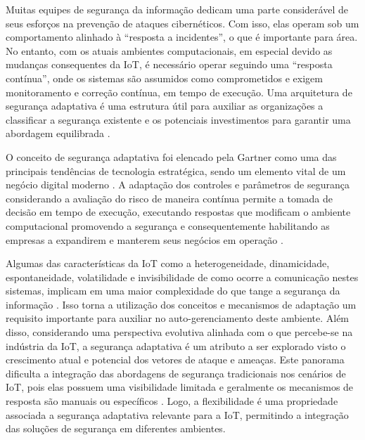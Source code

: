 \documentclass[tid,table]{texufpel} %
\begin{document}
Muitas equipes de segurança da informação dedicam uma parte considerável de seus esforços na prevenção de ataques cibernéticos. Com isso, elas operam sob um comportamento alinhado à ``resposta a incidentes'', o que é importante para área. No entanto, com os atuais ambientes computacionais, em especial devido as mudanças consequentes da IoT, é necessário operar seguindo uma ``resposta contínua'', onde os sistemas são assumidos como comprometidos e exigem monitoramento e correção contínua, em tempo de execução. Uma arquitetura de segurança adaptativa é uma estrutura útil para auxiliar as organizações a classificar a segurança existente e os potenciais investimentos para garantir uma abordagem equilibrada \cite{gartneradaptsec17}. 

O conceito de segurança adaptativa foi elencado pela Gartner como uma das principais tendências de tecnologia estratégica, sendo um elemento vital de um negócio digital moderno \cite{gartnerttrends17}. A adaptação dos controles e parâmetros de segurança considerando a avaliação do risco de maneira contínua permite a tomada de decisão em tempo de execução, executando respostas que modificam o ambiente computacional promovendo a segurança e consequentemente habilitando as empresas a expandirem e manterem seus negócios em operação \cite{gartnerttrends18}.

Algumas das características da IoT como a heterogeneidade, dinamicidade, espontaneidade, volatilidade e invisibilidade de como ocorre a comunicação nestes sistemas, implicam em uma maior complexidade do que tange a segurança da informação \cite{langheinrich10}. Isso torna a utilização dos conceitos e mecanismos de adaptação um requisito importante para auxiliar no auto-gerenciamento deste ambiente. Além disso, considerando uma perspectiva evolutiva alinhada com o que percebe-se na indústria da IoT, a segurança adaptativa é um atributo a ser explorado visto o crescimento atual e potencial dos vetores de ataque e ameaças. Este panorama dificulta a integração das abordagens de segurança tradicionais nos cenários de IoT, pois elas possuem uma visibilidade limitada e geralmente os mecanismos de resposta são manuais ou específicos \cite{yang12, zhao13, alaba17}. Logo, a flexibilidade é uma propriedade associada a segurança adaptativa relevante para a IoT, permitindo a integração das soluções de segurança em diferentes ambientes.
  
\end{document}
